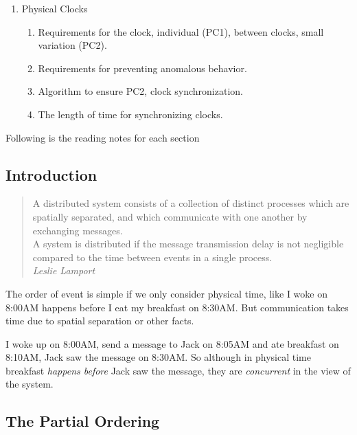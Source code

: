 \documentclass[12pt,a4paper,oneside]{article}
\begin{document}
\begin{enumerate}
\begin{enumerate}
  \end{enumerate}
  \item Physical Clocks
  \begin{enumerate}
      \item Requirements for the clock, individual (PC1), between clocks, small variation (PC2).
      \item Requirements for preventing anomalous behavior.
      \item Algorithm to ensure PC2, clock synchronization.
      \item The length of time for synchronizing clocks.
  \end{enumerate}
\end{enumerate}

Following is the reading notes for each section

\subsection{Introduction}

\begin{quote}
  A distributed system consists of a collection of distinct processes which are
spatially separated, and which communicate with one another by exchanging messages. \\
  A system is distributed if the message transmission delay is not negligible compared
to the time between events in a single process.\cite{l} \\

\textit{Leslie Lamport}
\end{quote}

The order of event is simple if we only consider physical time, like I woke on 8:00AM happens before
I eat my breakfast on 8:30AM.
But communication takes time due to spatial separation or other facts.

I woke up on 8:00AM, send a message to Jack on 8:05AM and ate breakfast on 8:10AM, Jack saw the message
on 8:30AM.
So although in physical time breakfast \textit{happens before} Jack saw the message, they are \textit{concurrent}
in the view of the system.

\subsection{The Partial Ordering} \label{PO}
\end{document}
